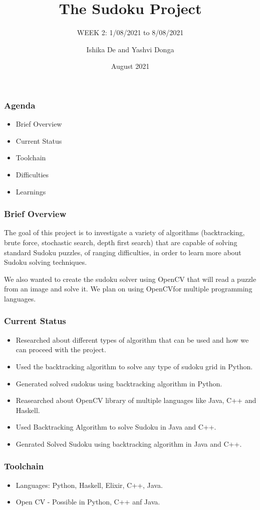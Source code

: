 \documentclass{beamer}
\title{The Sudoku Project}
\subtitle{WEEK 2: 1/08/2021 to 8/08/2021}
\author[Ishika | Yashvi]{Ishika De and Yashvi Donga}
\date{August 2021}
\begin{document}
\begin{frame}
     \titlepage
\end{frame}
\begin{frame}
     \frametitle{Agenda}
     \begin{itemize}
          \item Brief Overview
          \item Current Status
          \item Toolchain
          \item Difficulties
          \item Learnings
     \end{itemize}
\end{frame}

\begin{frame}
     \frametitle{Brief Overview}
     The goal of this project is to investigate a variety of algorithms (backtracking, brute force, stochastic search, depth first search) that are capable of solving
standard Sudoku puzzles, of ranging difficulties, in order to learn more about Sudoku
solving techniques.\newline

     We also wanted to create the sudoku solver using OpenCV that will read a puzzle from an image and solve it. We plan on using OpenCVfor multiple programming languages.
\end{frame}

\begin{frame}
     \frametitle{Current Status}   
     \begin{itemize}
          \item Researched about different types of algorithm that can be used and how we can proceed with the project.
          \item Used the backtracking algorithm to solve any type of sudoku grid in Python.
          \item Generated solved sudokus using backtracking algorithm in Python.
		  \item Reasearched about OpenCV library of multiple languages like Java, C++ and Haskell.
 		  \item Used Backtracking Algorithm to solve Sudoku in Java and C++. 
		  \item Genrated Solved Sudoku using backtracking algorithm in Java and C++.
	 \end{itemize}
\end{frame}


\begin{frame}
     \frametitle{Toolchain}
     \begin{itemize}
          \item Languages: Python, Haskell, Elixir, C++, Java.
          \item Open CV - Possible in Python, C++ anf Java.
     \end{itemize}
\end{frame}
\end{document}
